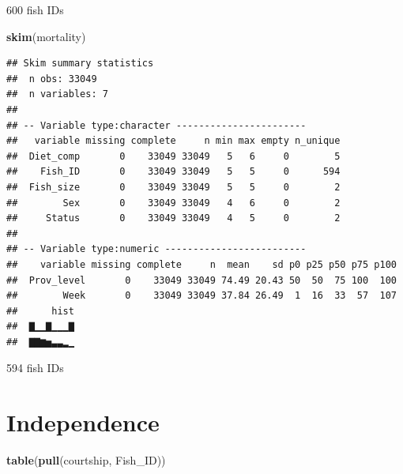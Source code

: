\documentclass[]{book}
\newenvironment{Shaded}{\begin{snugshade}}{\end{snugshade}}
\newcommand{\KeywordTok}[1]{\textcolor[rgb]{0.13,0.29,0.53}{\textbf{#1}}}
\newcommand{\NormalTok}[1]{#1}
\begin{document}
600 fish IDs

\begin{Shaded}
\begin{Highlighting}[]
\KeywordTok{skim}\NormalTok{(mortality)}
\end{Highlighting}
\end{Shaded}

\begin{verbatim}
## Skim summary statistics
##  n obs: 33049 
##  n variables: 7 
## 
## -- Variable type:character -----------------------
##   variable missing complete     n min max empty n_unique
##  Diet_comp       0    33049 33049   5   6     0        5
##    Fish_ID       0    33049 33049   5   5     0      594
##  Fish_size       0    33049 33049   5   5     0        2
##        Sex       0    33049 33049   4   6     0        2
##     Status       0    33049 33049   4   5     0        2
## 
## -- Variable type:numeric -------------------------
##    variable missing complete     n  mean    sd p0 p25 p50 p75 p100
##  Prov_level       0    33049 33049 74.49 20.43 50  50  75 100  100
##        Week       0    33049 33049 37.84 26.49  1  16  33  57  107
##      hist
##  ▇▁▁▇▁▁▁▇
##  ▇▇▆▅▃▃▂▁
\end{verbatim}

594 fish IDs

\hypertarget{independence}{%
\section{Independence}\label{independence}}

\begin{Shaded}
\begin{Highlighting}[]
\KeywordTok{table}\NormalTok{(}\KeywordTok{pull}\NormalTok{(courtship, Fish_ID))}
\end{Highlighting}
\end{Shaded}
\end{document}
